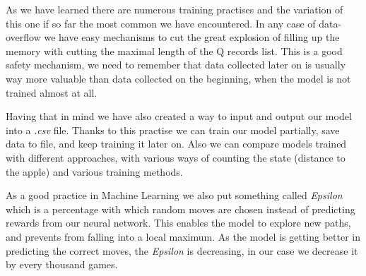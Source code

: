 \documentclass[]{article}
\begin{document}
\par As we have learned there are numerous training practises and the variation of this one if so far the most common we have encountered. In any case of data-overflow we have easy mechanisms to cut the great explosion of filling up the memory with cutting the maximal length of the Q records list. This is a good safety mechanism, we need to remember that data collected later on is usually way more valuable than data collected on the beginning, when the model is not trained almost at all.

\par Having that in mind we have also created a way to input and output our model into a \textit{.csv} file. Thanks to this practise we can train our model partially, save data to file, and keep training it later on. Also we can compare models trained with different approaches, with various ways of counting the state (distance to the apple) and various training methods. 

\par As a good practice in Machine Learning we also put something called \textit{Epsilon} which is a percentage with which random moves are chosen instead of predicting rewards from our neural network. This enables the model to explore new paths, and prevents from falling into a local maximum. As the model is getting better in predicting the correct moves, the \textit{Epsilon} is decreasing, in our case we decrease it by every thousand games.
\end{document}
